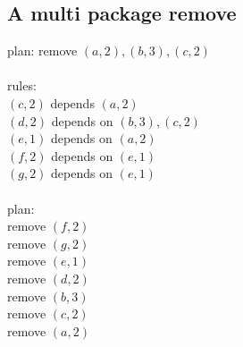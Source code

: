\documentclass[a4paper,11pt]{article}
\begin{document}
\subsection{A multi package remove}

plan: remove $(a,2), (b,3), (c,2)$\\
\\
rules:\\
  $(c,2)$ depends $(a,2)$\\
  $(d,2)$ depends on $(b,3), (c,2)$\\
  $(e,1)$ depends on $(a,2)$\\
  $(f,2)$ depends on $(e,1)$\\
  $(g,2)$ depends on $(e,1)$\\\\
plan:\\
  remove $(f,2)$\\
  remove $(g,2)$\\
  remove $(e,1)$\\
  remove $(d,2)$\\
  remove $(b,3)$\\
  remove $(c,2)$\\
  remove $(a,2)$\\
\end{document}
